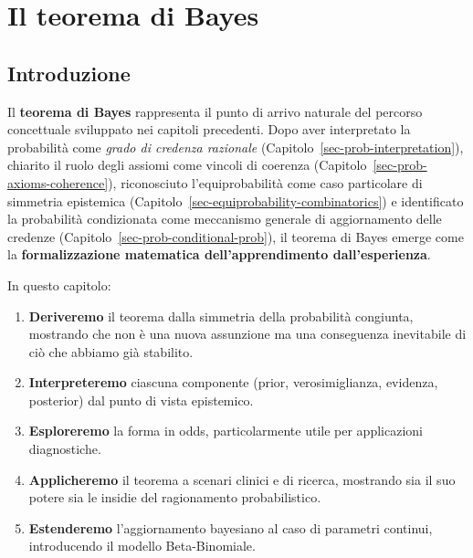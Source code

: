 \documentclass[
  italian,
  letterpaper,
  a4paper,
  11pt,
  open=any]{scrbook}
\theoremstyle{plain}
\theoremstyle{definition}
\theoremstyle{definition}
\theoremstyle{remark}
\begin{document}
\chapter{Il teorema di Bayes}\label{sec-prob-bayes-theorem}

\section*{Introduzione}\label{introduzione-4}


Il \textbf{teorema di Bayes} rappresenta il punto di arrivo naturale del
percorso concettuale sviluppato nei capitoli precedenti. Dopo aver
interpretato la probabilità come \emph{grado di credenza razionale}
(Capitolo~\ref{sec-prob-interpretation}), chiarito il ruolo degli
assiomi come vincoli di coerenza
(Capitolo~\ref{sec-prob-axioms-coherence}), riconosciuto
l'equiprobabilità come caso particolare di simmetria epistemica
(Capitolo~\ref{sec-equiprobability-combinatorics}) e identificato la
probabilità condizionata come meccanismo generale di aggiornamento delle
credenze (Capitolo~\ref{sec-prob-conditional-prob}), il teorema di Bayes
emerge come la \textbf{formalizzazione matematica dell'apprendimento
dall'esperienza}.

In questo capitolo:

\begin{enumerate}
\def\labelenumi{\arabic{enumi}.}
\item
  \textbf{Deriveremo} il teorema dalla simmetria della probabilità
  congiunta, mostrando che non è una nuova assunzione ma una conseguenza
  inevitabile di ciò che abbiamo già stabilito.
\item
  \textbf{Interpreteremo} ciascuna componente (prior, verosimiglianza,
  evidenza, posterior) dal punto di vista epistemico.
\item
  \textbf{Esploreremo} la forma in odds, particolarmente utile per
  applicazioni diagnostiche.
\item
  \textbf{Applicheremo} il teorema a scenari clinici e di ricerca,
  mostrando sia il suo potere sia le insidie del ragionamento
  probabilistico.
\item
  \textbf{Estenderemo} l'aggiornamento bayesiano al caso di parametri
  continui, introducendo il modello Beta-Binomiale.
\end{enumerate}
\end{document}
